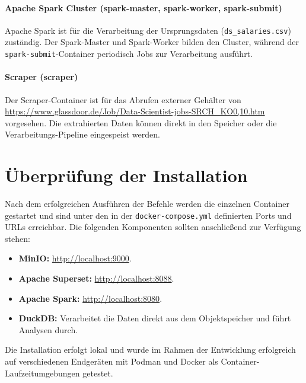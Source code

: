 \paragraph{Apache Spark Cluster (spark-master, spark-worker, spark-submit)}  
Apache Spark ist für die Verarbeitung der Ursprungsdaten (\lstinline|ds_salaries.csv|) zuständig. Der Spark-Master und Spark-Worker bilden den Cluster, während der \lstinline|spark-submit|-Container periodisch Jobs zur Verarbeitung ausführt. 

\paragraph{Scraper (scraper)}  
Der Scraper-Container ist für das Abrufen externer Gehälter von \url{https://www.glassdoor.de/Job/Data-Scientist-jobs-SRCH_KO0,10.htm} vorgesehen. Die extrahierten Daten können direkt in den Speicher oder die Verarbeitungs-Pipeline eingespeist werden.

\section{Überprüfung der Installation}

Nach dem erfolgreichen Ausführen der Befehle werden die einzelnen Container gestartet und sind unter den in der \lstinline|docker-compose.yml| definierten Ports und URLs erreichbar. Die folgenden Komponenten sollten anschließend zur Verfügung stehen:

\begin{itemize}
    \item \textbf{MinIO:} \url{http://localhost:9000}.
    \item \textbf{Apache Superset:} \url{http://localhost:8088}.
    \item \textbf{Apache Spark:} \url{http://localhost:8080}.
    \item \textbf{DuckDB:} Verarbeitet die Daten direkt aus dem Objektspeicher und führt Analysen durch.
\end{itemize}

Die Installation erfolgt lokal und wurde im Rahmen der Entwicklung erfolgreich auf verschiedenen Endgeräten mit Podman und Docker als Container-Laufzeitumgebungen getestet.



